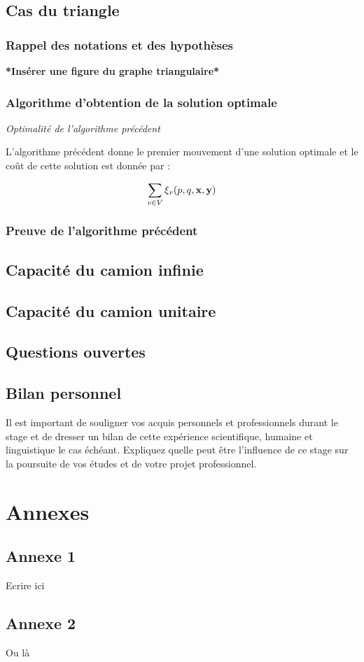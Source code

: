 \documentclass[twoside,11pt,openany,a4paper]{rapport}
\begin{document}
\chapter{Cas du triangle}
\label{Cas du Triangle}

\section{Rappel des notations et des hypothèses}

\textbf{*Insérer une figure du graphe triangulaire*}


\section{Algorithme d'obtention de la solution optimale}

\begin{thm}
\emph{Optimalité de l'algorithme précédent}

L'algorithme précédent donne le premier mouvement d'une solution optimale et le coût de cette solution est donnée par :

$$\sum_{v \in V}\xi_v(p,q,\bf{x},\bf{y})$$
\end{thm}

\section{Preuve de l'algorithme précédent}

\chapter{Capacité du camion infinie}

\chapter{Capacité du camion unitaire}

\chapter{Questions ouvertes}

\chapter*{Bilan personnel}
Il est important de souligner vos acquis personnels et professionnels durant le stage et de  dresser un bilan de cette expérience scientifique, humaine et linguistique le cas échéant. Expliquez quelle peut être l’influence de ce stage sur la poursuite de vos études et de votre projet professionnel.




\backmatter

\appendix
\part{Annexes}
\chapter{Annexe 1}
Ecrire ici

\chapter{Annexe 2}
Ou là
\end{document}
